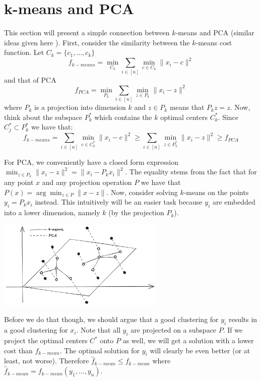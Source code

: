 \documentclass{article}
\begin{document}
\section{k-means and PCA}
This section will present a simple connection between $k$-means and PCA (similar ideas given here \cite{DingH04a}).
First, consider the similarity between the $k$-means cost function. Let $C_k = \{c_1,\ldots,c_k\}$ 
\[
f_{k-means} = \min_{C_k} \sum_{i \in [n]} \min_{c \in C_k} \|x_i - c\|^2
\]
and that of PCA
\[
f_{PCA} = \min_{P_k} \sum_{i \in [n]} \min_{z \in P_k} \|x_i - z\|^2 
\]
where $P_k$ is a projection into dimension $k$ and $z \in P_k$ means that $P_k z = z$.
Now, think about the subspace $P^{*}_{k}$ which contains the $k$ optimal centers $C^{*}_{k}$. 
Since $C^{*}_{j} \subset P^{*}_{k}$ we have that:
\[
f_{k-means} = \sum_{i \in [n]}  \min_{c \in C^{*}_k} \|x_i - c\|^2 \ge \sum_{i \in [n]} \min_{z \in P^{*}_k} \|x_i - z\|^2  \ge f_{PCA}
\]

\noindent For PCA, we conveniently have a closed form expression $ \min_{z \in P_k} \|x_i - z\|^2  = \|x_i - P_{k} x_i \|^2$.
The equality stems from the fact that for any point $x$ and any projection operation $P$ we have that $P(x) = \arg\min_{z \in P} \|x - z\|$.
Now, consider solving $k$-means on the points $y_i = P_k x_i$ instead. This intuitively will be an easier task
because $y_i$ are embedded into a lower dimension, namely $k$ (by the projection $P_k$).

\begin{center}
\includegraphics[width=0.6\textwidth]{images/kmeans-proj.png}
\end{center}

\noindent Before we do that though, we should argue that a good clustering for $y_i$ results in a good clustering for $x_i$.
Note that all $y_i$ are projected on a subspace $P$. If we project the optimal centers $C^*$ onto $P$ as well, we will get a solution with a lower cost than $f_{k-mean}$.
The optimal solution for $y_i$ will clearly be even better (or at least, not worse). Therefore $\hat{f}_{k-mean}\le f_{k-mean}$ where $\hat{f}_{k-mean} = f_{k-mean}(y_1,\ldots,y_n)$.
\end{document}
